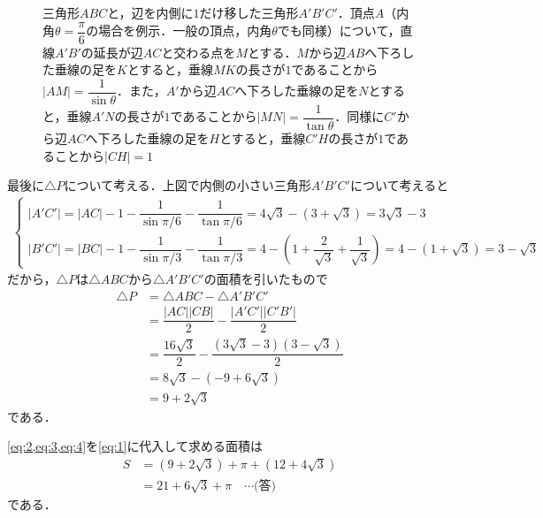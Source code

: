 \documentclass[../../main.tex]{subfiles}
\begin{document}
\begin{figure}[htb]
  \caption{三角形$ABC$と，辺を内側に$1$だけ移した三角形$A'B'C'$．頂点$A$（内角$\theta=\dfrac{\pi}{6}$の場合を例示．一般の頂点，内角$\theta$でも同様）について，直線$A'B'$の延長が辺$AC$と交わる点を$M$とする．$M$から辺$AB$へ下ろした垂線の足を$K$とすると，垂線$MK$の長さが$1$であることから$|AM|=\dfrac{1}{\sin\theta}$．また，$A'$から辺$AC$へ下ろした垂線の足を$N$とすると，垂線$A'N$の長さが$1$であることから$|MN|=\dfrac{1}{\tan\theta}$．同様に$C'$から辺$AC$へ下ろした垂線の足を$H$とすると，垂線$C'H$の長さが$1$であることから$|CH|=1$}
  \label{fig:tangent-construction}
\end{figure}

最後に$\triangle P$について考える．上図で内側の小さい三角形$A'B'C'$について考えると
\begin{align}
  \begin{cases}
    |A'C'| = |AC| - 1 - \dfrac{1}{\sin \pi/6} - \dfrac{1}{\tan \pi/6} = 4\sqrt{3}-(3+\sqrt{3}) = 3\sqrt{3} - 3\\
    |B'C'| = |BC| - 1 - \dfrac{1}{\sin \pi/3} - \dfrac{1}{\tan \pi/3} = 4 - \left(1 +\dfrac{2}{\sqrt{3}} + \dfrac{1}{\sqrt{3}}\right) = 4- \left(1+\sqrt{3}\right)= 3 - \sqrt{3}
  \end{cases}
\end{align}
だから，$\triangle P$は$\triangle ABC$から$\triangle A'B'C'$の面積を引いたもので
\begin{align}
  \triangle P
  &= \triangle ABC - \triangle A'B'C' \\
  &= \dfrac{|AC||CB|}{2} - \dfrac{|A'C'||C'B'|}{2} \\
  &= \dfrac{16\sqrt{3}}{2} - \dfrac{(3\sqrt{3}-3)(3-\sqrt{3})}{2} \\
  &= 8\sqrt{3} - (-9+6\sqrt{3}) \\
  &= 9+2\sqrt{3} \label{eq:4}
\end{align}
である．

\cref{eq:2,eq:3,eq:4}を\cref{eq:1}に代入して求める面積は
\begin{align}
  S &= (9+2\sqrt{3}) + \pi + (12+4\sqrt{3}) \\
  &= 21+6\sqrt{3}+\pi \quad \cdots\text{(答)}
\end{align}
である．
\end{document}
